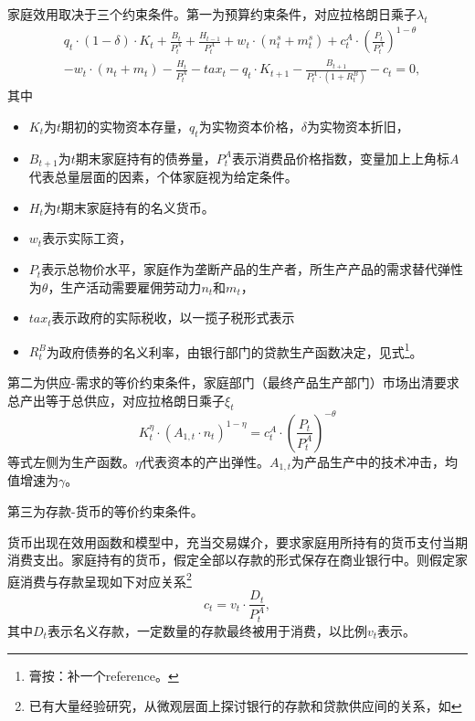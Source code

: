 家庭效用取决于三个约束条件。第一为预算约束条件，对应拉格朗日乘子$\lambda_t$
\begin{equation}
  \label{eq:hh-bud-cons}
  \begin{split}
  &q_t \cdot (1-\delta) \cdot K_t + \frac{B_t}{P_t^A} + \frac{H_{t-1}}{P_t^A} + w_t \cdot \left( n_t^s + m_t^s \right) + c_t^A \cdot \left( \frac{P_t}{P_t^A} \right)^{1-\theta} \\
  &- w_t \cdot \left( n_t + m_t \right) - \frac{H_t}{P_t^A} - tax_t - q_t \cdot K_{t+1} - \frac{B_{t+1}}{P_t^A \cdot \left(1 + R_t^B\right)}  - c_t = 0,
  \end{split}
  \end{equation}
其中
\begin{itemize}
  \item $K_t$为$t$期初的实物资本存量，$q_t$为实物资本价格，$\delta$为实物资本折旧，
  \item $B_{t+1}$为$t$期末家庭持有的债券量，$P_t^A$表示消费品价格指数，变量加上上角标$A$代表总量层面的因素，个体家庭视为给定条件。
  \item $H_{t}$为$t$期末家庭持有的名义货币。
  \item $w_t$表示实际工资，
  \item $P_t$表示总物价水平，家庭作为垄断产品的生产者，所生产产品的需求替代弹性为$\theta$，生产活动需要雇佣劳动力$n_t$和$m_t$，
  \item $tax_t$表示政府的实际税收，以一揽子税形式表示
  \item $R_t^B$为政府债券的名义利率，由银行部门的贷款生产函数决定，见式\footnote{膏按：补一个reference。}。
\end{itemize}

第二为供应-需求的等价约束条件，家庭部门（最终产品生产部门）市场出清要求总产出等于总供应，对应拉格朗日乘子$\xi_t$
\begin{equation}
\label{eq:mkt-clearing-hh}
K_t^{\eta} \cdot \left( A_{1,t} \cdot n_t \right)^{1-\eta} = c_t^A \cdot \left( \frac{P_t}{P_t^A} \right)^{-\theta}
\end{equation}
等式左侧为生产函数。$\eta$代表资本的产出弹性。$A_{1,t}$为产品生产中的技术冲击，均值增速为$\gamma$。

第三为存款-货币的等价约束条件。

货币出现在效用函数和模型中，充当交易媒介，要求家庭用所持有的货币支付当期消费支出。家庭持有的货币，假定全部以存款的形式保存在商业银行中。则假定家庭消费与存款呈现如下对应关系\footnote{已有大量经验研究，从微观层面上探讨银行的存款和贷款供应间的关系，如\cite{Kashyap2002}}
\begin{equation}
\label{eq:constraint-deposit-money}
c_t = v_t \cdot \frac{D_t}{P_t^A},
\end{equation}
其中$D_t$表示名义存款，一定数量的存款最终被用于消费，以比例$v_t$表示。

